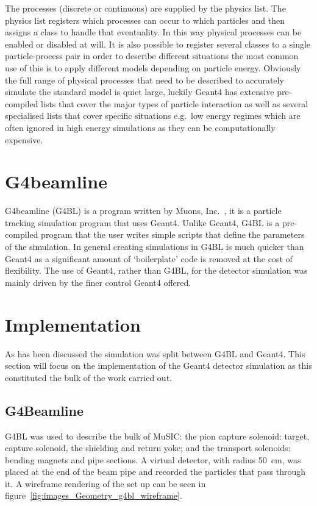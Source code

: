 The processes (discrete or continuous) are supplied by the physics list. The physics list registers which processes can occur to which particles and then assigns a class to handle that eventuality. In this way physical processes can be enabled or disabled at will. It is also possible to register several classes to a single particle-process pair in order to describe different situations the most common use of this is to apply different models depending on particle energy. Obviously the full range of physical processes that need to be described to accurately simulate the standard model is quiet large, luckily Geant4 has extensive pre-compiled lists that cover the major types of particle interaction as well as several specialised lists that cover specific situations e.g.\ low energy regimes which are often ignored in high energy simulations as they can be computationally expensive. 

\section{G4beamline} %
\label{sec:g4beamline}
G4beamline (G4BL) is a program written by Muons, Inc.~\cite{G4BL ref}, it is a particle tracking simulation program that uses Geant4. Unlike Geant4, G4BL is a pre-compiled program that the user writes simple scripts that define the parameters of the simulation. In general creating simulations in G4BL is much quicker than Geant4 as a significant amount of `boilerplate' code is removed at the cost of flexibility. The use of Geant4, rather than G4BL, for the detector simulation was mainly driven by the finer control Geant4 offered.

\section{Implementation} %
\label{cha:implementation}
As has been discussed the simulation was split between G4BL and Geant4. This section will focus on the implementation of the Geant4 detector simulation as this constituted the bulk of the work carried out.

\subsection{G4Beamline} %
\label{sec:g4beamline_impl}
G4BL was used to describe the bulk of MuSIC: the pion capture solenoid: target, capture solenoid, the shielding and return yoke; and the transport solenoids: bending magnets and pipe sections. A virtual detector, with radius 50~cm, was placed at the end of the beam pipe and recorded the particles that pass through it. A wireframe rendering of the set up can be seen in figure~\ref{fig:images_Geometry_g4bl_wireframe}. 


